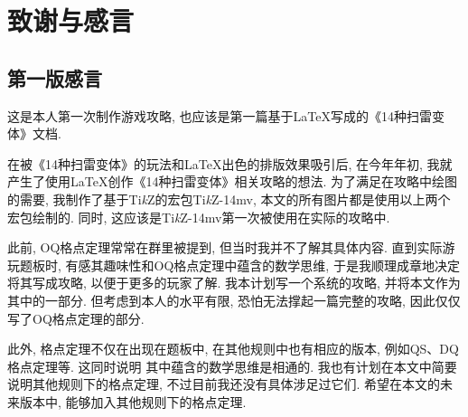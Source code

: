 \documentclass{ctexart}
\newcommand{\varible}[1]{{\Noto[#1]}}
\begin{document}



\pagebreak

\section{致谢与感言}

\subsection{第一版感言}

这是本人第一次制作游戏攻略, 也应该是第一篇基于\LaTeX 写成的《14种扫雷变体》文档. 

在被《14种扫雷变体》的玩法和\LaTeX 出色的排版效果吸引后, 在今年年初, 我就产生了使用\LaTeX 创作《14种扫雷变体》相关攻略的想法. 为了满足在攻略中绘图的需要, 我制作了基于Ti\emph{k}Z的宏包Ti\emph{k}Z-14mv, 本文的所有图片都是使用以上两个宏包绘制的. 同时, 这应该是Ti\emph{k}Z-14mv第一次被使用在实际的攻略中.

此前, OQ格点定理常常在群里被提到, 但当时我并不了解其具体内容. 直到实际游玩\varible{O}\varible{Q}题板时, 有感其趣味性和OQ格点定理中蕴含的数学思维, 于是我顺理成章地决定将其写成攻略, 以便于更多的玩家了解. 我本计划写一个系统的\varible{O}\varible{Q}攻略, 并将本文作为其中的一部分. 但考虑到本人的水平有限, 恐怕无法撑起一篇完整的攻略, 因此仅仅写了OQ格点定理的部分.

此外, 格点定理不仅在出现在\varible{O}\varible{Q}题板中, 在其他规则中也有相应的版本, 例如QS、DQ格点定理等. 这同时说明 其中蕴含的数学思维是相通的. 我也有计划在本文中简要说明其他规则下的格点定理, 不过目前我还没有具体涉足过它们. 希望在本文的未来版本中, 能够加入其他规则下的格点定理.
\end{document}
